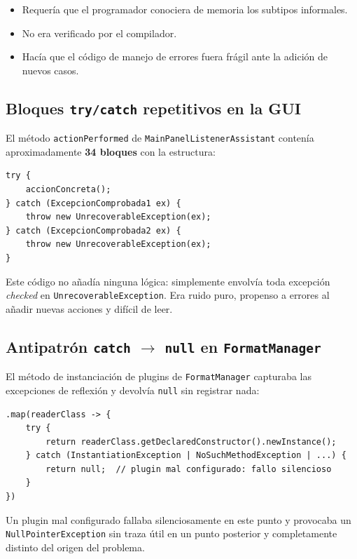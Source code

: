 \documentclass[12pt,a4paper]{article}
\begin{document}
\begin{itemize}
  \item Requería que el programador conociera de memoria los subtipos informales.
  \item No era verificado por el compilador.
  \item Hacía que el código de manejo de errores fuera frágil ante la adición
    de nuevos casos.
\end{itemize}

\subsection{Bloques \texttt{try/catch} repetitivos en la GUI}
\label{sec:prob-try}

El método \texttt{actionPerformed} de \texttt{MainPanelListenerAssistant}
contenía aproximadamente \textbf{34 bloques} con la estructura:

\begin{lstlisting}[caption={Patrón repetitivo antes de la refactorización}]
try {
    accionConcreta();
} catch (ExcepcionComprobada1 ex) {
    throw new UnrecoverableException(ex);
} catch (ExcepcionComprobada2 ex) {
    throw new UnrecoverableException(ex);
}
\end{lstlisting}

Este código no añadía ninguna lógica: simplemente envolvía toda excepción
\emph{checked} en \texttt{UnrecoverableException}. Era ruido puro, propenso
a errores al añadir nuevas acciones y difícil de leer.

\subsection{Antipatrón \texttt{catch} $\to$ \texttt{null} en \texttt{FormatManager}}
\label{sec:prob-null}

El método de instanciación de plugins de \texttt{FormatManager} capturaba las
excepciones de reflexión y devolvía \texttt{null} sin registrar nada:

\begin{lstlisting}[caption={Antipatrón original en \texttt{FormatManager}}]
.map(readerClass -> {
    try {
        return readerClass.getDeclaredConstructor().newInstance();
    } catch (InstantiationException | NoSuchMethodException | ...) {
        return null;  // plugin mal configurado: fallo silencioso
    }
})
\end{lstlisting}

Un plugin mal configurado fallaba silenciosamente en este punto y provocaba
un \texttt{NullPointerException} sin traza útil en un punto posterior y
completamente distinto del origen del problema.
\end{document}
